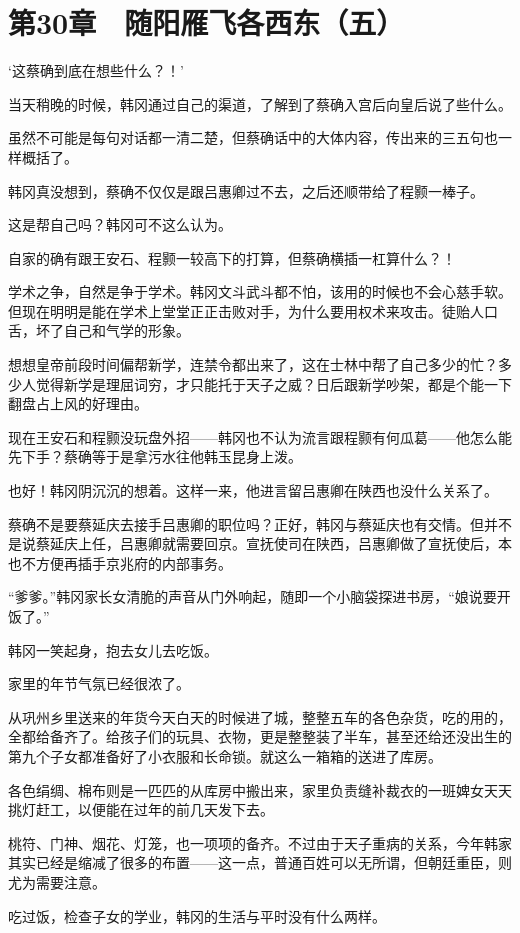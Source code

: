 \section{第30章　随阳雁飞各西东（五）}

‘这蔡确到底在想些什么？！’

当天稍晚的时候，韩冈通过自己的渠道，了解到了蔡确入宫后向皇后说了些什么。

虽然不可能是每句对话都一清二楚，但蔡确话中的大体内容，传出来的三五句也一样概括了。

韩冈真没想到，蔡确不仅仅是跟吕惠卿过不去，之后还顺带给了程颢一棒子。

这是帮自己吗？韩冈可不这么认为。

自家的确有跟王安石、程颢一较高下的打算，但蔡确横插一杠算什么？！

学术之争，自然是争于学术。韩冈文斗武斗都不怕，该用的时候也不会心慈手软。但现在明明是能在学术上堂堂正正击败对手，为什么要用权术来攻击。徒贻人口舌，坏了自己和气学的形象。

想想皇帝前段时间偏帮新学，连禁令都出来了，这在士林中帮了自己多少的忙？多少人觉得新学是理屈词穷，才只能托于天子之威？日后跟新学吵架，都是个能一下翻盘占上风的好理由。

现在王安石和程颢没玩盘外招——韩冈也不认为流言跟程颢有何瓜葛——他怎么能先下手？蔡确等于是拿污水往他韩玉昆身上泼。

也好！韩冈阴沉沉的想着。这样一来，他进言留吕惠卿在陕西也没什么关系了。

蔡确不是要蔡延庆去接手吕惠卿的职位吗？正好，韩冈与蔡延庆也有交情。但并不是说蔡延庆上任，吕惠卿就需要回京。宣抚使司在陕西，吕惠卿做了宣抚使后，本也不方便再插手京兆府的内部事务。

“爹爹。”韩冈家长女清脆的声音从门外响起，随即一个小脑袋探进书房，“娘说要开饭了。”

韩冈一笑起身，抱去女儿去吃饭。

家里的年节气氛已经很浓了。

从巩州乡里送来的年货今天白天的时候进了城，整整五车的各色杂货，吃的用的，全都给备齐了。给孩子们的玩具、衣物，更是整整装了半车，甚至还给还没出生的第九个子女都准备好了小衣服和长命锁。就这么一箱箱的送进了库房。

各色绢绸、棉布则是一匹匹的从库房中搬出来，家里负责缝补裁衣的一班婢女天天挑灯赶工，以便能在过年的前几天发下去。

桃符、门神、烟花、灯笼，也一项项的备齐。不过由于天子重病的关系，今年韩家其实已经是缩减了很多的布置——这一点，普通百姓可以无所谓，但朝廷重臣，则尤为需要注意。

吃过饭，检查子女的学业，韩冈的生活与平时没有什么两样。

